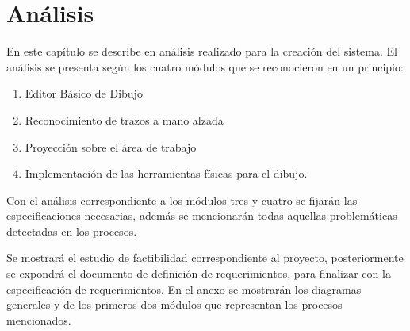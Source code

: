 \chapter{Análisis}

En este capítulo se describe en análisis realizado para la creación del sistema. 
El análisis se presenta según los cuatro módulos que se reconocieron en un principio: 

\begin{enumerate}
 \item Editor Básico de Dibujo
\item Reconocimiento de trazos a mano alzada
\item Proyección sobre el área de trabajo 
\item Implementación de las herramientas físicas para el dibujo.
\end{enumerate}

Con el análisis correspondiente a los módulos tres y cuatro se fijarán las especificaciones necesarias, además se mencionarán todas aquellas problemáticas detectadas en los procesos.  

Se mostrará el estudio de factibilidad correspondiente al proyecto, posteriormente se expondrá el documento de definición de requerimientos, para finalizar con la especificación de requerimientos. 
En el anexo se mostrarán los diagramas generales y de los primeros dos módulos que representan   los procesos mencionados.
